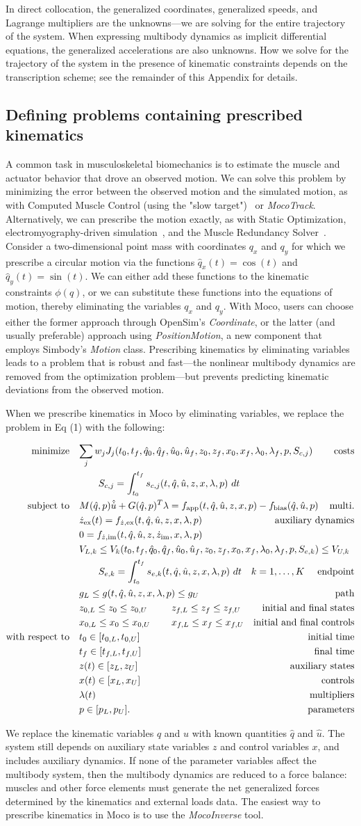 \documentclass[10pt,letterpaper]{article}
\newcommand{\prescribed}{
\begin{align}
    \begin{aligned}
        \mbox{minimize} \quad & \mathrlap{\sum_j w_j J_{j}(t_0, t_f, \hat{q}_0, \hat{q}_f, \hat{u}_0, \hat{u}_f, z_0, z_f, x_{0}, x_{f}, \lambda_0, \lambda_f, p, S_{c,j})} &&& \textrm{costs} \\
        & \quad\quad \mathrlap{S_{c,j} = \int_{t_0}^{t_f} s_{c,j}(t, \hat{q}, \hat{u}, z, x, \lambda, p)~dt} \\
        \mbox{subject to} \quad &
         M(\hat{q}, p)\hat{\dot{u}} + \mathrlap{G(\hat{q}, p)^T \lambda = f_{\textrm{app}}(t, \hat{q}, \hat{u}, z, x, p) - f_{\textrm{bias}}(\hat{q}, \hat{u}, p)} &&& \textrm{multi.} \\
        & \mathrlap{\dot{z}_{\textrm{ex}}(t) = f_{\dot{z},\textrm{ex}}(t, \hat{q}, \hat{u}, z, x, \lambda, p)} &&& \textrm{auxiliary dynamics} \\
        & \mathrlap{0 = f_{\dot{z},\textrm{im}}(t, \hat{q}, \hat{u}, z, \dot{z}_\textrm{im}, x, \lambda, p)} \\
        & V_{L,k} \leq V_k(t_0, t_f, \hat{q}_0, \mathrlap{\hat{q}_f, \hat{u}_0, \hat{u}_f, z_0, z_f, x_{0}, x_{f}, \lambda_0, \lambda_f, p, S_{e,k}) \leq V_{U,k}} \\
        & \quad\quad \mathrlap{S_{e,k} = \int_{t_0}^{t_f} s_{e,k}(t, \hat{q}, \hat{u}, z, x, \lambda, p)~dt \quad k = 1, \ldots, K} &&& \textrm{endpoint} \\
        & \mathrlap{g_{L} \leq g(t, \hat{q}, \hat{u}, z, x, \lambda, p) \leq g_{U}} &&& \textrm{path} \\
        & z_{0,L} \leq z_0 \leq z_{0,U} && z_{f,L} \leq z_f \leq z_{f,U} & \textrm{initial and final states} \\
        & x_{0,L} \leq x_0 \leq x_{0,U} && x_{f,L} \leq x_f \leq x_{f,U} & \textrm{initial and final controls} \\
        \mbox{with respect to} \quad
        & t_0 \in [t_{0,L}, t_{0,U}] &&& \textrm{initial time} \\
        & t_f \in [t_{f,L}, t_{f,U}] &&& \textrm{final time} \\
        & z(t) \in [z_{L}, z_{U}] &&& \textrm{auxiliary states} \\
        & x(t) \in [x_{L}, x_{U}] &&& \textrm{controls} \\
        & \lambda(t) &&& \textrm{multipliers} \\
        & p \in [p_{L}, p_{U}]. &&& \textrm{parameters}
    \end{aligned}
\end{align}
}
\begin{document}
In direct collocation, the generalized coordinates, generalized speeds, and Lagrange multipliers are the unknowns—we are solving for the entire trajectory of the system. When expressing multibody dynamics as implicit differential equations, the generalized accelerations are also unknowns. How we solve for the trajectory of the system in the presence of kinematic constraints depends on the transcription scheme; see the remainder of this Appendix for details.

\subsection*{Defining problems containing prescribed kinematics}

A common task in musculoskeletal biomechanics is to estimate the muscle and actuator behavior that drove an observed motion. We can solve this problem by minimizing the error between the observed motion and the simulated motion, as with Computed Muscle Control (using the "slow target")~\cite{Thelen:2003bba} or \textit{MocoTrack}. Alternatively, we can prescribe the motion exactly, as with Static Optimization, electromyography-driven simulation~\cite{Lloyd:2003}, and the Muscle Redundancy Solver~\cite{Groote:2016dq}. Consider a two-dimensional point mass with coordinates $q_x$ and $q_y$ for which we prescribe a circular motion via the functions $\hat{q}_x(t) = \cos(t)$ and $\hat{q}_y(t) = \sin(t)$. We can either add these functions to the kinematic constraints $\phi(q)$, or we can substitute these functions into the equations of motion, thereby eliminating the variables $q_x$ and $q_y$. With Moco, users can choose either the former approach through OpenSim’s \textit{Coordinate}, or the latter (and usually preferable) approach using \textit{PositionMotion}, a new component that employs Simbody’s \textit{Motion} class. Prescribing kinematics by eliminating variables leads to a problem that is robust and fast—the nonlinear multibody dynamics are removed from the optimization problem—but prevents predicting kinematic deviations from the observed motion.

When we prescribe kinematics in Moco by eliminating variables, we replace the problem in Eq (1) with the following:

\prescribed

We replace the kinematic variables $q$ and $u$ with known quantities $\hat{q}$ and $\hat{u}$. The system still depends on auxiliary state variables $z$ and control variables $x$, and includes auxiliary dynamics. If none of the parameter variables affect the multibody system, then the multibody dynamics are reduced to a force balance: muscles and other force elements must generate the net generalized forces determined by the kinematics and external loads data. The easiest way to prescribe kinematics in Moco is to use the \textit{MocoInverse} tool.
\end{document}
